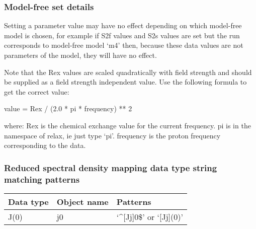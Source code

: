 \subsubsection{Model-free set details}

Setting a parameter value may have no effect depending on which model-free model is chosen,
for example if S2f values and S2s values are set but the run corresponds to model-free model
`m4' then, because these data values are not parameters of the model, they will have no
effect.

Note that the Rex values are scaled quadratically with field strength and should be supplied
as a field strength independent value.  Use the following formula to get the correct value:

    value = Rex / (2.0 * pi * frequency) ** 2

where:
    Rex is the chemical exchange value for the current frequency.
    pi is in the namespace of relax, ie just type `pi'.
    frequency is the proton frequency corresponding to the data.



\subsubsection{Reduced spectral density mapping data type string matching patterns}



\begin{center}
\begin{tabular}{lll}
\toprule
Data type & Object name & Patterns \\
\midrule
 J(0)                    &  j0            &  `\^{}[Jj]0\$' or `[Jj](0)'                            \\
\bottomrule
\end{tabular}
\end{center}

